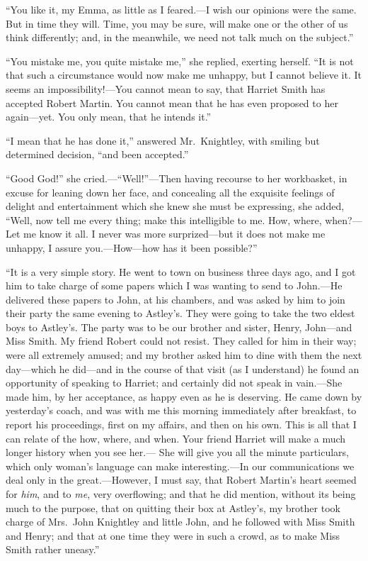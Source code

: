 ``You like it, my Emma, as little as I feared.---I wish our opinions were
the same.  But in time they will.  Time, you may be sure, will make
one or the other of us think differently; and, in the meanwhile,
we need not talk much on the subject.''

``You mistake me, you quite mistake me,'' she replied, exerting herself.
``It is not that such a circumstance would now make me unhappy,
but I cannot believe it.  It seems an impossibility!---You cannot mean
to say, that Harriet Smith has accepted Robert Martin.  You cannot
mean that he has even proposed to her again---yet.  You only mean,
that he intends it.''

``I mean that he has done it,'' answered Mr.\ Knightley, with smiling
but determined decision, ``and been accepted.''

``Good God!'' she cried.---``Well!''---Then having recourse to her workbasket,
in excuse for leaning down her face, and concealing all the
exquisite feelings of delight and entertainment which she knew she
must be expressing, she added, ``Well, now tell me every thing;
make this intelligible to me.  How, where, when?---Let me know it all.
I never was more surprized---but it does not make me unhappy,
I assure you.---How---how has it been possible?''

``It is a very simple story.  He went to town on business three days ago,
and I got him to take charge of some papers which I was wanting
to send to John.---He delivered these papers to John, at his chambers,
and was asked by him to join their party the same evening to Astley's.
They were going to take the two eldest boys to Astley's. The party
was to be our brother and sister, Henry, John---and Miss Smith.
My friend Robert could not resist.  They called for him in their way;
were all extremely amused; and my brother asked him to dine with
them the next day---which he did---and in the course of that visit
(as I understand) he found an opportunity of speaking to Harriet;
and certainly did not speak in vain.---She made him, by her acceptance,
as happy even as he is deserving.  He came down by yesterday's coach,
and was with me this morning immediately after breakfast, to report
his proceedings, first on my affairs, and then on his own.
This is all that I can relate of the how, where, and when.
Your friend Harriet will make a much longer history when you see her.---%
She will give you all the minute particulars, which only woman's
language can make interesting.---In our communications we deal only
in the great.---However, I must say, that Robert Martin's heart seemed
for \emph{him}, and to \emph{me}, very overflowing; and that he did mention,
without its being much to the purpose, that on quitting their
box at Astley's, my brother took charge of Mrs.\ John Knightley
and little John, and he followed with Miss Smith and Henry;
and that at one time they were in such a crowd, as to make Miss Smith
rather uneasy.''


